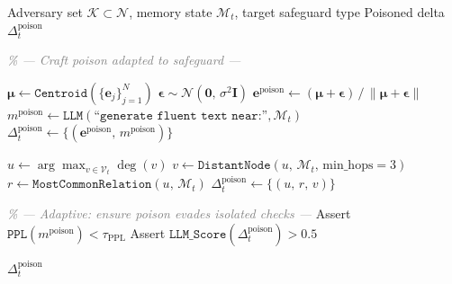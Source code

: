 \begin{algorithm}[t]
\caption{Memory Poisoning Attack}
\label{alg:memory_poisoning}
\begin{algorithmic}[1]
\Require Adversary set $\mathcal{K} \subset \mathcal{N}$,
  memory state $\mathcal{M}_t$, target safeguard type
\Ensure Poisoned delta $\Delta_t^{\text{poison}}$


  \State \textcolor{gray}{\textit{\% --- Craft poison adapted to safeguard ---}}

    \State $\boldsymbol{\mu} \gets \texttt{Centroid}(\{\mathbf{e}_j\}_{j=1}^{N})$
    \State $\boldsymbol{\epsilon} \sim \mathcal{N}(\mathbf{0},\, \sigma^2 \mathbf{I})$
    \State $\mathbf{e}^{\text{poison}} \gets
      (\boldsymbol{\mu} + \boldsymbol{\epsilon})\, /\,
      \|\boldsymbol{\mu} + \boldsymbol{\epsilon}\|$
    \State $m^{\text{poison}} \gets \texttt{LLM}(\texttt{``generate fluent
      text near:''}, \mathcal{M}_t)$
    \State $\Delta_t^{\text{poison}} \gets
      \{(\mathbf{e}^{\text{poison}},\, m^{\text{poison}})\}$
  \EndIf

    \State $u \gets \arg\max_{v \in \mathcal{V}_t}
      \deg(v)$
    \State $v \gets \texttt{DistantNode}(u,\,
      \mathcal{M}_t,\, \text{min\_hops}{=}3)$
    \State $r \gets \texttt{MostCommonRelation}(u,\,
      \mathcal{M}_t)$
    \State $\Delta_t^{\text{poison}} \gets
      \{(u,\, r,\, v)\}$
  \EndIf

  \State \textcolor{gray}{\textit{\% --- Adaptive: ensure poison evades
    isolated checks ---}}
  \State Assert $\texttt{PPL}(m^{\text{poison}}) <
    \tau_{\text{PPL}}$
  \State Assert $\texttt{LLM\_Score}(\Delta_t^{\text{poison}})
    > 0.5$

  \State \Return $\Delta_t^{\text{poison}}$
\EndFor
\end{algorithmic}
\end{algorithm}


